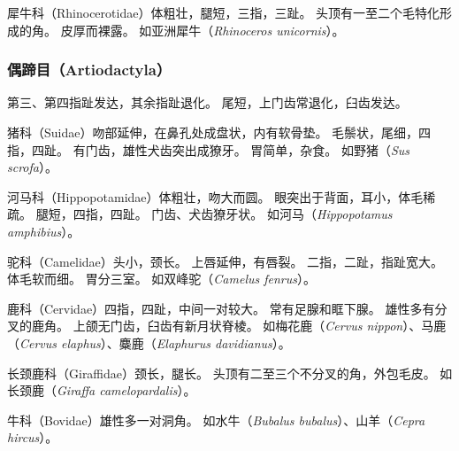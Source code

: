 \documentclass[11pt]{article}
\begin{document}
\newline

犀牛科（Rhinocerotidae）体粗壮，腿短，三指，三趾。
头顶有一至二个毛特化形成的角。
皮厚而裸露。
如亚洲犀牛（\textit{Rhinoceros unicornis}）。

\subsubsection{偶蹄目（Artiodactyla）}
第三、第四指趾发达，其余指趾退化。
尾短，上门齿常退化，臼齿发达。

\newline

猪科（Suidae）吻部延伸，在鼻孔处成盘状，内有软骨垫。
毛鬃状，尾细，四指，四趾。
有门齿，雄性犬齿突出成獠牙。
胃简单，杂食。
如野猪（\textit{Sus scrofa}）。

\newline

河马科（Hippopotamidae）体粗壮，吻大而圆。
眼突出于背面，耳小，体毛稀疏。
腿短，四指，四趾。
门齿、犬齿獠牙状。
如河马（\textit{Hippopotamus amphibius}）。

\newline

驼科（Camelidae）头小，颈长。
上唇延伸，有唇裂。
二指，二趾，指趾宽大。
体毛软而细。
胃分三室。
如双峰驼（\textit{Camelus fenrus}）。

\newline

鹿科（Cervidae）四指，四趾，中间一对较大。
常有足腺和眶下腺。
雄性多有分叉的鹿角。
上颌无门齿，臼齿有新月状脊棱。
如梅花鹿（\textit{Cervus nippon}）、马鹿（\textit{Cervus elaphus}）、麋鹿（\textit{Elaphurus davidianus}）。

\newline

长颈鹿科（Giraffidae）颈长，腿长。
头顶有二至三个不分叉的角，外包毛皮。
如长颈鹿（\textit{Giraffa camelopardalis}）。

\newline

牛科（Bovidae）雄性多一对洞角。
如水牛（\textit{Bubalus bubalus}）、山羊（\textit{Cepra hircus}）。
\end{document}

